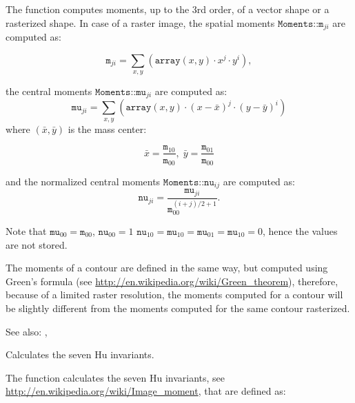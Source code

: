\begin{description}
\end{description}

The function computes moments, up to the 3rd order, of a vector shape or a rasterized shape.
In case of a raster image, the spatial moments $\texttt{Moments::m}_{ji}$ are computed as:

\[\texttt{m}_{ji}=\sum_{x,y} \left(\texttt{array}(x,y) \cdot x^j \cdot y^i\right),\]

the central moments $\texttt{Moments::mu}_{ji}$ are computed as:
\[\texttt{mu}_{ji}=\sum_{x,y} \left(\texttt{array}(x,y) \cdot (x - \bar{x})^j \cdot (y - \bar{y})^i\right)\]
where $(\bar{x}, \bar{y})$ is the mass center:

\[
\bar{x}=\frac{\texttt{m}_{10}}{\texttt{m}_{00}},\; \bar{y}=\frac{\texttt{m}_{01}}{\texttt{m}_{00}}
\]

and the normalized central moments $\texttt{Moments::nu}_{ij}$ are computed as:
\[\texttt{nu}_{ji}=\frac{\texttt{mu}_{ji}}{\texttt{m}_{00}^{(i+j)/2+1}}.\]

Note that $\texttt{mu}_{00}=\texttt{m}_{00}$, $\texttt{nu}_{00}=1$ $\texttt{nu}_{10}=\texttt{mu}_{10}=\texttt{mu}_{01}=\texttt{mu}_{10}=0$, hence the values are not stored.

The moments of a contour are defined in the same way, but computed using Green's formula
(see \url{http://en.wikipedia.org/wiki/Green_theorem}), therefore, because of a limited raster resolution, the moments computed for a contour will be slightly different from the moments computed for the same contour rasterized.

See also: , 

Calculates the seven Hu invariants.

\begin{description}
\end{description}

The function calculates the seven Hu invariants, see \url{http://en.wikipedia.org/wiki/Image_moment}, that are defined as:

